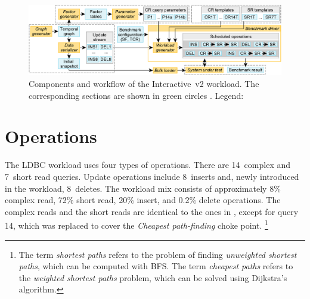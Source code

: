\begin{figure}[htb]
    \centering
    \includegraphics[scale=\yedscale]{figures/interactive-v2-components}
    \caption{
        Components and workflow of the Interactive~v2 workload.
        The corresponding sections are shown in green circles \Circled{\textsf{\scriptsize \S}}.
        Legend:
    }
    \label{fig:interactive-components}
\end{figure}

\section{Operations}

The LDBC \snbinteractivevtwo workload uses four types of operations.
There are 14~complex and 7~short read queries.
Update operations include
8~inserts and, newly introduced in the \interactivevtwo workload, 8~deletes.
The workload mix consists of approximately
8\% complex read,
72\% short read,
20\% insert, and
0.2\% delete operations.
The complex reads and the short reads are identical to the ones in \interactivevone, except for query 14, which was replaced to cover the \emph{Cheapest path-finding} choke point.%
\footnote{
    The term \emph{shortest paths} refers to the problem of finding \emph{unweighted shortest paths}, which can be computed with BFS.
    The term \emph{cheapest paths} refers to the \emph{weighted shortest paths} problem, which can be solved using \eg Dijkstra's algorithm.
}

